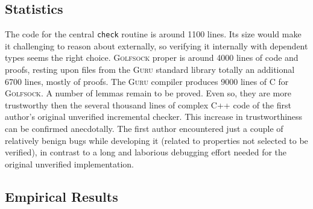 \documentclass[preprint,natbib]{sigplanconf}
\begin{document}
\subsection{Statistics}

The code for the central \texttt{check} routine is around 1100 lines.
Its size would make it challenging to reason about externally, so
verifying it internally with dependent types seems the right choice.
\textsc{Golfsock} proper is around 4000 lines of code and proofs,
resting upon files from the \textsc{Guru} standard library totally an
additional 6700 lines, mostly of proofs.  The \textsc{Guru} compiler
produces 9000 lines of C for \textsc{Golfsock}.  A number of lemmas
remain to be proved.  Even so, they are more trustworthy then the
several thousand lines of complex C++ code of the first author's
original unverified incremental checker. This increase in
trustworthiness can be confirmed anecdotally.  The first author
encountered just a couple of relatively benign bugs while developing
it (related to properties not selected to be verified), in contrast to
a long and laborious debugging effort needed for the original
unverified implementation.

\subsection{Empirical Results}
\end{document}
